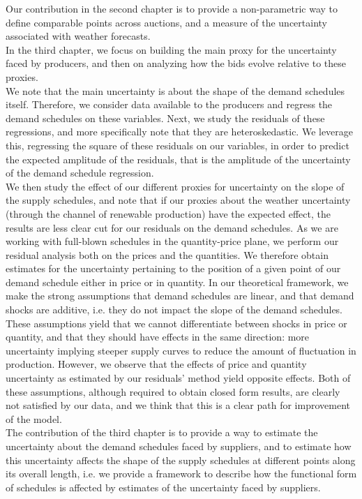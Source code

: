 Our contribution in the second chapter is to provide a non-parametric way to define comparable points across auctions, and a measure of the uncertainty associated with weather forecasts.\\

In the third chapter, we focus on building the main proxy for the uncertainty faced by producers, and then on analyzing how the bids evolve relative to these proxies.\\

We note that the main uncertainty is about the shape of the demand schedules itself. Therefore, we consider data available to the producers and regress the demand schedules on these variables. Next, we study the residuals of these regressions, and more specifically note that they are heteroskedastic. We leverage this, regressing the square of these residuals on our variables, in order to predict the expected amplitude of the residuals, that is the amplitude of the uncertainty of the demand schedule regression.\\

We then study the effect of our different proxies for uncertainty on the slope of the supply schedules, and note that if our proxies about the weather uncertainty (through the channel of renewable production) have the expected effect, the results are less clear cut for our residuals on the demand schedules. As we are working with full-blown schedules in the quantity-price plane, we perform our residual analysis both on the prices and the quantities. We therefore obtain estimates for the uncertainty pertaining to the position of a given point of our demand schedule either in price or in quantity. In our theoretical framework, we make the strong assumptions that demand schedules are linear, and that demand shocks are additive, i.e. they do not impact the slope of the demand schedules. These assumptions yield that we cannot differentiate between shocks in price or quantity, and that they should have effects in the same direction: more uncertainty implying steeper supply curves to reduce the amount of fluctuation in production. However, we observe that the effects of price and quantity uncertainty as estimated by our residuals' method yield opposite effects. Both of these assumptions, although required to obtain closed form results, are clearly not satisfied by our data, and we think that this is a clear path for improvement of the model.  \\

The contribution of the third chapter is to provide a way to estimate the uncertainty about the demand schedules faced by suppliers, and to estimate how this uncertainty affects the shape of the supply schedules at different points along its overall length, i.e. we provide a framework to describe how the functional form of schedules is affected by estimates of the uncertainty faced by suppliers.



